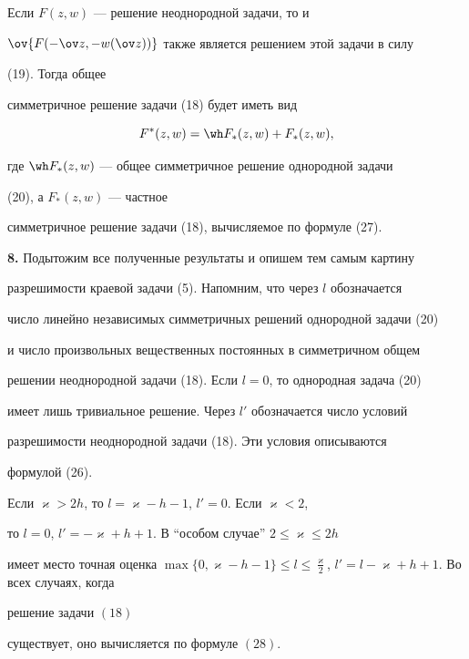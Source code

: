 Если $F(z,w)$ --- решение неоднородной задачи, то и 


$\ov{F(-\ov z,-w(\ov z))}$ также является решением этой задачи в силу 


(19). Тогда общее 


симметричное решение задачи (18) будет иметь вид 


\begin{equation} 


F^*(z,w)=\wh F_*(z,w)+F_*(z,w), 


\end{equation} 


где $\wh F_*(z,w)$ --- общее симметричное решение однородной задачи 


(20), а $F_*(z,w)$ --- частное 


симметричное решение задачи (18), вычисляемое по формуле (27). 


\medskip 


 


{\bf 8.} Подытожим все полученные результаты и опишем тем самым картину 


разрешимости краевой задачи (5). Напомним, что через $l$ обозначается 


число линейно независимых симметричных решений однородной задачи (20) 


и число произвольных вещественных постоянных в симметричном общем 


решении неоднородной задачи (18). Если $l=0$, то однородная задача (20) 


имеет лишь тривиальное решение. Через $l'$ обозначается число условий 


разрешимости неоднородной задачи (18). Эти условия описываются 


формулой (26). 


 


\begin{thm} 


Если $\varkappa>2h$, то $l=\varkappa-h-1$, $l'=0$. Если $\varkappa<2$, 


то $l=0$, $l'=-\varkappa+h+1$. В ``особом случае'' $2\le\varkappa\le2h$ 


имеет место точная оценка $\max\{0,\varkappa-h-1\}\le 


l\le\frac{\varkappa}{2}$, $l'=l-\varkappa+h+1$. Во всех случаях, когда 


решение задачи $(18)$ 


существует, оно вычисляется по формуле $(28)$. 


\end{thm} 


